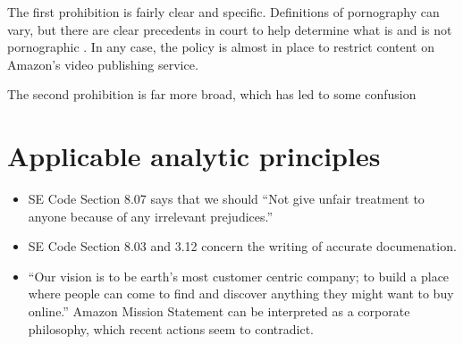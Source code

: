\documentclass[10pt]{article}
\begin{document}
\begin{multicols}{2}
The first prohibition is fairly clear and specific.  Definitions of pornography can vary, but there are clear precedents in court to help determine what is and is not pornographic \cite{MillerVsCA}.  In any case, the policy is almost in place to restrict content on Amazon's video publishing service. 

The second prohibition is far more broad, which has led to some confusion

%
%
%
\section{Applicable analytic principles}
\begin{itemize}
\item SE Code Section 8.07 says that we should ``Not give unfair treatment to anyone because of any irrelevant prejudices.'' \cite{secode}

\item SE Code Section 8.03 and 3.12 concern the writing of accurate documenation. \cite{secode}

\item ``Our vision is to be earth's most customer centric company; to build a place where people can come to find and discover anything they might want to buy online.'' Amazon Mission Statement can be interpreted as a corporate philosophy, which recent actions seem to contradict. \cite{AmazonIRFAQ}


\end{itemize}
\end{multicols}
\end{document}
